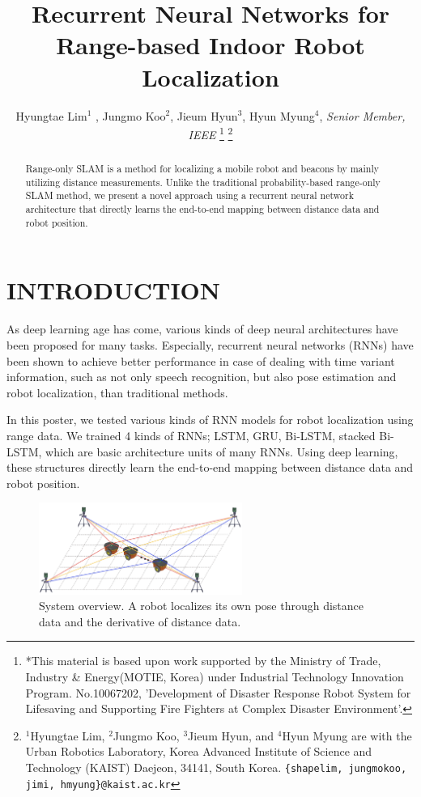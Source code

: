 \documentclass[letterpaper, 10 pt, conference]{ieeeconf}  %
\title{\LARGE \bf
Recurrent Neural Networks for Range-based Indoor Robot Localization}
\author{Hyungtae Lim$^{1}$ , Jungmo Koo$^{2}$, Jieum Hyun$^{3}$, Hyun Myung$^{4}$, \textit{Senior Member, IEEE}%
\thanks{
	*This material is based upon work supported by the Ministry of Trade, Industry \& Energy(MOTIE, Korea) under Industrial Technology Innovation Program. No.10067202, 'Development of Disaster Response Robot System for Lifesaving and Supporting Fire Fighters at Complex Disaster Environment'.}%
\thanks{$^{1}$Hyungtae Lim, $^{2}$Jungmo Koo, $^{3}$Jieum Hyun, and $^{4}$Hyun Myung are with
	the Urban Robotics Laboratory, Korea Advanced Institute of Science
	and Technology (KAIST) Daejeon, 34141, South Korea. {\tt\small \{shapelim, jungmokoo, jimi, hmyung\}@kaist.ac.kr}}%
%
}
\begin{document}


\maketitle
\thispagestyle{empty}
\pagestyle{empty}


\begin{abstract}

Range-only SLAM is a method for localizing a mobile robot and beacons by mainly utilizing distance measurements. Unlike the traditional probability-based range-only SLAM method, we present a novel approach using a recurrent neural network architecture that directly learns the end-to-end mapping between distance data and robot position.

\end{abstract}


\section{INTRODUCTION}

 As deep learning age has come, various kinds of deep neural architectures have been proposed for many tasks. Especially, recurrent neural networks (RNNs) have been shown to achieve better performance in case of dealing with time variant information, such as not only speech recognition, but also pose estimation and robot localization, than traditional methods. 
 
In this poster, we tested various kinds of RNN models for robot localization using range data. We trained 4 kinds of RNNs; LSTM\cite{hochreiter1997long}, GRU\cite{cho2014learning}, Bi-LSTM\cite{schuster1997bidirectional}, stacked Bi-LSTM, which are basic architecture units of many RNNs. Using deep learning, these structures directly learn the end-to-end mapping between distance data and robot position. 

\begin{figure}[h]
	
	\centering
	\includegraphics[height=3.0cm]{overview}
		
	\label{fig:example}

	\caption{System overview. A robot localizes its own pose through distance data and the derivative of distance data. }
	
\end{figure}
\end{document}
